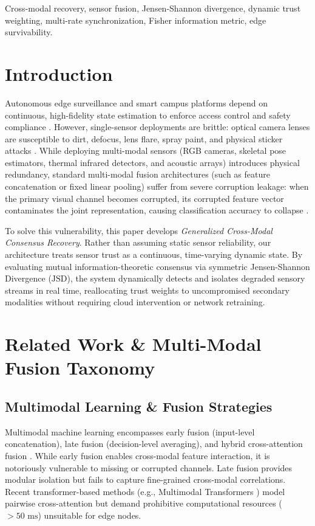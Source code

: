 \documentclass[conference]{IEEEtran}
\begin{document}
\begin{IEEEkeywords}
Cross-modal recovery, sensor fusion, Jensen-Shannon divergence, dynamic trust weighting, multi-rate synchronization, Fisher information metric, edge survivability.
\end{IEEEkeywords}

\section{Introduction}
Autonomous edge surveillance and smart campus platforms depend on continuous, high-fidelity state estimation to enforce access control and safety compliance \cite{baltrusaitis2018multimodal, ramachandram2017deep}. However, single-sensor deployments are brittle: optical camera lenses are susceptible to dirt, defocus, lens flare, spray paint, and physical sticker attacks \cite{dodge2016understanding, hendrycks2019benchmarking}. While deploying multi-modal sensors (RGB cameras, skeletal pose estimators, thermal infrared detectors, and acoustic arrays) introduces physical redundancy, standard multi-modal fusion architectures (such as feature concatenation or fixed linear pooling) suffer from severe corruption leakage: when the primary visual channel becomes corrupted, its corrupted feature vector contaminates the joint representation, causing classification accuracy to collapse \cite{tsai2019multimodal}.

To solve this vulnerability, this paper develops \textit{Generalized Cross-Modal Consensus Recovery}. Rather than assuming static sensor reliability, our architecture treats sensor trust as a continuous, time-varying dynamic state. By evaluating mutual information-theoretic consensus via symmetric Jensen-Shannon Divergence ($\text{JSD}$), the system dynamically detects and isolates degraded sensory streams in real time, reallocating trust weights to uncompromised secondary modalities without requiring cloud intervention or network retraining.

\section{Related Work \& Multi-Modal Fusion Taxonomy}
\subsection{Multimodal Learning \& Fusion Strategies}
Multimodal machine learning encompasses early fusion (input-level concatenation), late fusion (decision-level averaging), and hybrid cross-attention fusion \cite{baltrusaitis2018multimodal}. While early fusion enables cross-modal feature interaction, it is notoriously vulnerable to missing or corrupted channels. Late fusion provides modular isolation but fails to capture fine-grained cross-modal correlations. Recent transformer-based methods (e.g., Multimodal Transformers \cite{tsai2019multimodal}) model pairwise cross-attention but demand prohibitive computational resources ($>50\text{ ms}$) unsuitable for edge nodes.
\end{document}
